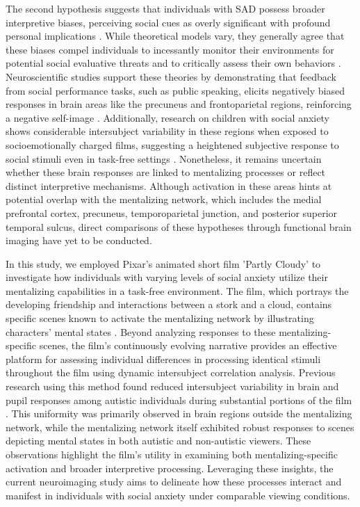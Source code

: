 The second hypothesis suggests that individuals with SAD possess broader interpretive biases, perceiving social cues as overly significant with profound personal implications \citep{clark1995,rapee1997}. While theoretical models vary, they generally agree that these biases compel individuals to incessantly monitor their environments for potential social evaluative threats \citep{amir1998,constans1999,heimberg2014,hirsch2004information,stopa2000} and to critically assess their own behaviors \citep{rapee1992,stopa1993}. Neuroscientific studies support these theories by demonstrating that feedback from social performance tasks, such as public speaking, elicits negatively biased responses in brain areas like the precuneus and frontoparietal regions, reinforcing a negative self-image \citep{koban2023}. Additionally, research on children with social anxiety shows considerable intersubject variability in these regions when exposed to socioemotionally charged films, suggesting a heightened subjective response to social stimuli even in task-free settings \citep{camacho2023}. Nonetheless, it remains uncertain whether these brain responses are linked to mentalizing processes or reflect distinct interpretive mechanisms. Although activation in these areas hints at potential overlap with the mentalizing network, which includes the medial prefrontal cortex, precuneus, temporoparietal junction, and posterior superior temporal sulcus, direct comparisons of these hypotheses through functional brain imaging have yet to be conducted.

In this study, we employed Pixar's animated short film 'Partly Cloudy' to investigate how individuals with varying levels of social anxiety utilize their mentalizing capabilities in a task-free environment. The film, which portrays the developing friendship and interactions between a stork and a cloud, contains specific scenes known to activate the mentalizing network by illustrating characters' mental states \citep{jacoby2016,paunov2019,richardson2018}. Beyond analyzing responses to these mentalizing-specific scenes, the film's continuously evolving narrative provides an effective platform for assessing individual differences in processing identical stimuli throughout the film using dynamic intersubject correlation analysis. Previous research using this method found reduced intersubject variability in brain and pupil responses among autistic individuals during substantial portions of the film \citep{mangnus2024bpcnni}. This uniformity was primarily observed in brain regions outside the mentalizing network, while the mentalizing network itself exhibited robust responses to scenes depicting mental states in both autistic and non-autistic viewers. These observations highlight the film's utility in examining both mentalizing-specific activation and broader interpretive processing. Leveraging these insights, the current neuroimaging study aims to delineate how these processes interact and manifest in individuals with social anxiety under comparable viewing conditions.

